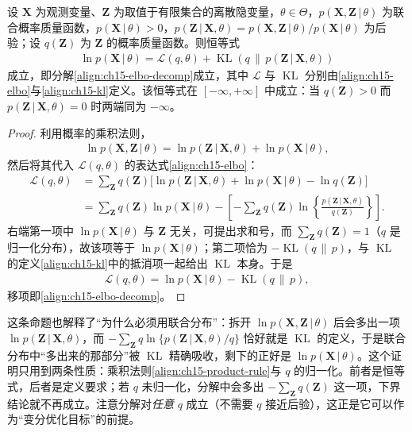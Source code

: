 \documentclass[../../main.tex]{subfiles}
\begin{document}
\begin{proposition}[ELBO 分解]\label{proposition:ch15-ELBO分解}
设 $\bm{X}$ 为观测变量、$\bm{Z}$ 为取值于有限集合的离散隐变量，$\theta\in\Theta$，$p(\bm{X},\bm{Z}\,|\,\theta)$ 为联合概率质量函数，$p(\bm{X}\,|\,\theta)>0$，$p(\bm{Z}\,|\,\bm{X},\theta)=p(\bm{X},\bm{Z}\,|\,\theta)/p(\bm{X}\,|\,\theta)$ 为后验；设 $q(\bm{Z})$ 为 $\bm{Z}$ 的概率质量函数。则恒等式
\begin{align*}
\ln p(\bm{X}\,|\,\theta)=\mathcal{L}(q,\theta)+\operatorname{KL}\!\left(q\,\|\,p(\bm{Z}\,|\,\bm{X},\theta)\right)
\end{align*}
成立，即分解\eqref{align:ch15-elbo-decomp}成立，其中 $\mathcal{L}$ 与 $\operatorname{KL}$ 分别由\eqref{align:ch15-elbo}与\eqref{align:ch15-kl}定义。该恒等式在 $[-\infty,+\infty]$ 中成立：当 $q(\bm{Z})>0$ 而 $p(\bm{Z}\,|\,\bm{X},\theta)=0$ 时两端同为 $-\infty$。
\end{proposition}
\begin{proof}
利用概率的乘积法则，
\begin{align}
\ln p(\bm{X},\bm{Z}\,|\,\theta)=\ln p(\bm{Z}\,|\,\bm{X},\theta)+\ln p(\bm{X}\,|\,\theta),
\label{align:ch15-product-rule}
\end{align}
然后将其代入 $\mathcal{L}(q,\theta)$ 的表达式\eqref{align:ch15-elbo}：
\begin{align*}
\mathcal{L}(q,\theta)
&=\sum_{\bm{Z}}q(\bm{Z})\Big[\ln p(\bm{Z}\,|\,\bm{X},\theta)+\ln p(\bm{X}\,|\,\theta)-\ln q(\bm{Z})\Big]\\
&=\sum_{\bm{Z}}q(\bm{Z})\ln p(\bm{X}\,|\,\theta)
-\left[-\sum_{\bm{Z}}q(\bm{Z})\ln\!\left\{\frac{p(\bm{Z}\,|\,\bm{X},\theta)}{q(\bm{Z})}\right\}\right].
\end{align*}
右端第一项中 $\ln p(\bm{X}\,|\,\theta)$ 与 $\bm{Z}$ 无关，可提出求和号，而 $\sum_{\bm{Z}}q(\bm{Z})=1$（$q$ 是归一化分布），故该项等于 $\ln p(\bm{X}\,|\,\theta)$；第二项恰为 $-\operatorname{KL}(q\,\|\,p)$，与 $\operatorname{KL}$ 的定义\eqref{align:ch15-kl}中的抵消项一起给出 $\operatorname{KL}$ 本身。于是
\begin{align*}
\mathcal{L}(q,\theta)=\ln p(\bm{X}\,|\,\theta)-\operatorname{KL}\!\left(q\,\|\,p\right),
\end{align*}
移项即\eqref{align:ch15-elbo-decomp}。
\end{proof}

\begin{remark}
这条命题也解释了“为什么必须用联合分布”：拆开 $\ln p(\bm{X},\bm{Z}\,|\,\theta)$ 后会多出一项 $\ln p(\bm{Z}\,|\,\bm{X},\theta)$，而 $-\sum_{\bm{Z}}q\ln\{p(\bm{Z}\,|\,\bm{X},\theta)/q\}$ 恰好就是 $\operatorname{KL}$ 的定义，于是联合分布中“多出来的那部分”被 $\operatorname{KL}$ 精确吸收，剩下的正好是 $\ln p(\bm{X}\,|\,\theta)$。这个证明只用到两条性质：乘积法则\eqref{align:ch15-product-rule}与 $q$ 的归一化。前者是恒等式，后者是定义要求；若 $q$ 未归一化，分解中会多出 $-\sum_{\bm{Z}}q(\bm{Z})$ 这一项，下界结论就不再成立。注意分解对\emph{任意} $q$ 成立（不需要 $q$ 接近后验），这正是它可以作为“变分优化目标”的前提。
\end{remark}
\end{document}
